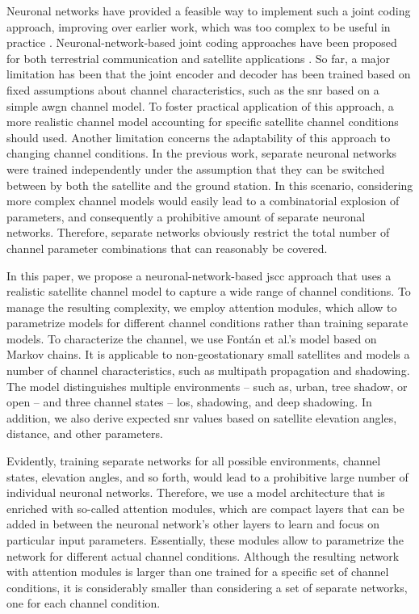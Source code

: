 \documentclass[conference]{IEEEtran}
\begin{document}
Neuronal networks have provided a feasible way to implement such a joint coding approach, improving over earlier work, which was too complex to be useful in practice \cite{9838671}.
Neuronal-network-based joint coding approaches have been proposed for both terrestrial communication \cite{Bourtsoulatze2019} and satellite applications \cite{satjscc}.
So far, a major limitation has been that the joint encoder and decoder has been trained based on fixed assumptions about channel characteristics, such as the \ac{snr} based on a simple \ac{awgn} channel model. 
To foster practical application of this approach, 
a more realistic channel model accounting for specific satellite channel conditions should used.
Another limitation concerns the adaptability of this approach to changing channel conditions. In the previous work, separate neuronal networks were trained independently under the assumption that they can be switched between by both the satellite and the ground station.
In this scenario, considering more complex channel models would easily lead to a combinatorial explosion of parameters, and consequently a prohibitive amount of separate neuronal networks.
Therefore, separate networks obviously restrict the total number of channel parameter combinations that can reasonably be covered.

In this paper, we propose a neuronal-network-based \ac{jscc} approach that uses a realistic satellite channel model to capture a wide range of channel conditions.
To manage the resulting complexity, we employ attention modules, which allow to parametrize models for different channel conditions rather than training separate models.
To characterize the channel, we use Fontán et al.'s model \cite{fontan2001} based on Markov chains.
It is applicable to non-geostationary small satellites and models a number of channel characteristics, such as multipath propagation and shadowing.
The model distinguishes multiple environments -- such as, urban, tree shadow, or open -- and three channel states -- \ac{los}, shadowing, and deep shadowing.
In addition, we also derive expected \ac{snr} values based on satellite elevation angles, distance, and other parameters.

Evidently, training separate networks for all possible environments, channel states, elevation angles, and so forth, would lead to a prohibitive large number of individual neuronal networks.
Therefore, we use a model architecture that is enriched with so-called attention modules, which are compact layers that can be added in between the neuronal network's other layers to learn and focus on particular input parameters.
Essentially, these modules allow to parametrize the network for different actual channel conditions.
Although the resulting network with attention modules is larger than one trained for a specific set of channel conditions, it is considerably smaller than considering a set of separate networks, one for each channel condition.
\end{document}
